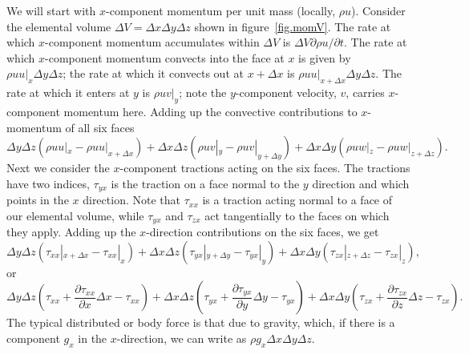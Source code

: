 \documentclass[twoside,11pt]		{report}
\begin{document}
We will start with $x$-component momentum per unit mass (locally,
$\rho u$).  Consider the elemental volume $\Delta V=\Delta x\Delta
y\Delta z$ shown in figure~\ref{fig.momV}. The rate at which
$x$-component momentum accumulates within $\Delta V$ is $\Delta
V\partial \rho u/\partial t$. The rate at which $x$-component momentum
convects into the face at $x$ is given by $\rho uu|_{x}\Delta y\Delta
z$; the rate at which it convects out at $x+\Delta x$ is $\rho
uu|_{x+\Delta x}\Delta y\Delta z$. The rate at which it enters at $y$
is $\rho uv|_y$; note the $y$-component velocity, $v$, carries
$x$-component momentum here. Adding up the convective contributions to
$x$-momentum of all six faces
\begin{equation}
\Delta y\Delta z(\rho uu|_x-\rho uu|_{x+\Delta x})+\Delta x\Delta
z(\rho uv|_y-\rho uv|_{y+\Delta y})+\Delta x\Delta y(\rho uw|_z-\rho
uw|_{z+\Delta z}).
\end{equation}
Next we consider the $x$-component tractions acting on the six
faces. The tractions have two indices, \eg $\tau_{yx}$ is
the traction on a face normal to the $y$ direction and which points in
the $x$ direction. Note that $\tau_{xx}$ is a traction acting normal
to a face of our elemental volume, while $\tau_{yx}$ and $\tau_{zx}$
act tangentially to the faces on which they apply. Adding up the
$x$-direction contributions on the six faces, we get
\begin{equation}
\Delta y\Delta z(\tau_{xx}|_{x+\Delta x}-\tau_{xx}|_x)+\Delta x\Delta
z(\tau_{yx}|_{y+\Delta y} - \tau_{yx}|_y)+\Delta x\Delta
y(\tau_{zx}|_{z+\Delta z}-\tau_{zx}|_z),
\end{equation}
or
\begin{equation}
\Delta y\Delta z(\tau_{xx}+\frac{\partial \tau_{xx}}{\partial x}\Delta x-\tau_{xx})+\Delta x\Delta
z(\tau_{yx} + \frac{\partial\tau_{yx}}{\partial y}\Delta y - \tau_{yx})+\Delta x\Delta
y(\tau_{zx}+\frac{\partial\tau_{zx}}{\partial z}\Delta z-\tau_{zx}).
\end{equation}
The typical distributed or body force is that due to gravity, which,
if there is a component $g_x$ in the $x$-direction, we can write as
$\rho g_x \Delta x\Delta y\Delta z$.
\end{document}
